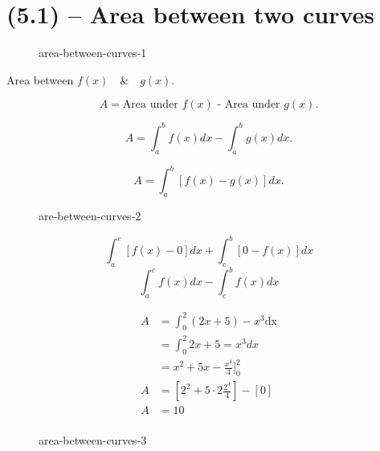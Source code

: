 
\chapter{(5.1) -- Area between two curves}


\begin{figure}[ht]
    \centering
    \caption{area-between-curves-1}
    \label{fig:area-between-curves-1}
\end{figure}

Area between $f(x)\quad \& \quad g(x)$.

\[ A= \text{Area under $f(x)$ - Area under $g(x)$} .\] 

\[ A= \int^b_a f(x) dx - \int^b_a g(x) dx .\] 

\[
    A=\int^b_a \left[f(x)-g(x)\right] dx
.\] 



\begin{figure}[htbp]
    \centering
    \caption{are-between-curves-2}
    \label{fig:are-between-curves-2}
\end{figure}

\[ \int_{a}^{c} \left[ f(x)-0 \right] dx + \int_{c}^{b}  \left[ 0-f(x) \right] dx \] 
\[ \int_{a}^{c}  f(x) dx - \int_{c}^{b} f(x) dx \] 




\begin{align*}
A &=\int_{0}^{2}  (2x+5) - x^3 \text{dx}\\
&= \int_{0}^{2}2x+5=x^3 dx   \\
&= x^2+5x - \frac{x^4}{4}]^2_0  \\
A &= \left[ 2^2+5\cdot 2 \frac{2^4}{4} \right] - \left[ 0 \right]   \\
A&= 10 \\
\end{align*}


\begin{figure}[htbp]
    \centering
    \caption{area-between-curves-3}
    \label{fig:area-between-curves-3}
\end{figure}    

